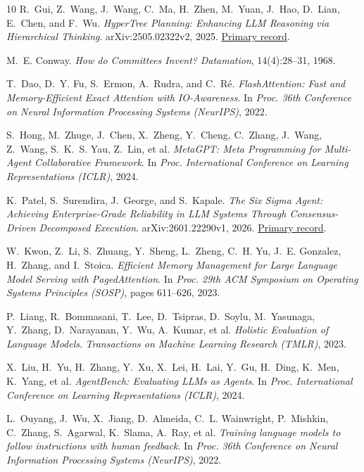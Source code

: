 \documentclass[11pt,a4paper]{article}
\begin{document}
\begin{thebibliography}{10}
R.~Gui, Z.~Wang, J.~Wang, C.~Ma, H.~Zhen, M.~Yuan, J.~Hao, D.~Lian, E.~Chen, and F.~Wu.
\newblock \emph{HyperTree Planning: Enhancing LLM Reasoning via Hierarchical Thinking}.
\newblock arXiv:2505.02322v2, 2025.
\newblock \href{https://arxiv.org/abs/2505.02322v2}{Primary record}.

M.~E. Conway.
\newblock \emph{How do Committees Invent?}
\newblock \emph{Datamation}, 14(4):28--31, 1968.

T.~Dao, D.~Y. Fu, S.~Ermon, A.~Rudra, and C.~R{\'e}.
\newblock \emph{FlashAttention: Fast and Memory-Efficient Exact Attention with IO-Awareness}.
\newblock In \emph{Proc. 36th Conference on Neural Information Processing Systems (NeurIPS)}, 2022.

S.~Hong, M.~Zhuge, J.~Chen, X.~Zheng, Y.~Cheng, C.~Zhang, J.~Wang, Z.~Wang, S.~K.~S. Yau, Z.~Lin, et al.
\newblock \emph{MetaGPT: Meta Programming for Multi-Agent Collaborative Framework}.
\newblock In \emph{Proc. International Conference on Learning Representations (ICLR)}, 2024.

K.~Patel, S.~Surendira, J.~George, and S.~Kapale.
\newblock \emph{The Six Sigma Agent: Achieving Enterprise-Grade Reliability in LLM Systems Through Consensus-Driven Decomposed Execution}.
\newblock arXiv:2601.22290v1, 2026.
\newblock \href{https://arxiv.org/abs/2601.22290v1}{Primary record}.

W.~Kwon, Z.~Li, S.~Zhuang, Y.~Sheng, L.~Zheng, C.~H. Yu, J.~E. Gonzalez, H.~Zhang, and I.~Stoica.
\newblock \emph{Efficient Memory Management for Large Language Model Serving with PagedAttention}.
\newblock In \emph{Proc. 29th ACM Symposium on Operating Systems Principles (SOSP)}, pages 611--626, 2023.

P.~Liang, R.~Bommasani, T.~Lee, D.~Tsipras, D.~Soylu, M.~Yasunaga, Y.~Zhang, D.~Narayanan, Y.~Wu, A.~Kumar, et al.
\newblock \emph{Holistic Evaluation of Language Models}.
\newblock \emph{Transactions on Machine Learning Research (TMLR)}, 2023.

X.~Liu, H.~Yu, H.~Zhang, Y.~Xu, X.~Lei, H.~Lai, Y.~Gu, H.~Ding, K.~Men, K.~Yang, et al.
\newblock \emph{AgentBench: Evaluating LLMs as Agents}.
\newblock In \emph{Proc. International Conference on Learning Representations (ICLR)}, 2024.

L.~Ouyang, J.~Wu, X.~Jiang, D.~Almeida, C.~L. Wainwright, P.~Mishkin, C.~Zhang, S.~Agarwal, K.~Slama, A.~Ray, et al.
\newblock \emph{Training language models to follow instructions with human feedback}.
\newblock In \emph{Proc. 36th Conference on Neural Information Processing Systems (NeurIPS)}, 2022.


\end{thebibliography}
\end{document}

